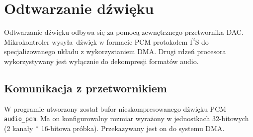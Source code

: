 \documentclass[12pt]{report}
\newcommand{\imgint}[4]{
	\begin{figure}[{#4}]
		\centering
		\texttt{[image: \#1]}
		\caption{#2}
		\label{#1}
	\end{figure}
}
\newcommand{\imgcs}[3]{\imgint{#1}{#2}{#3}{}}
\newcommand{\isqs}{$\text{I}^{2}\text{S}$}
\begin{document}
	\section{Odtwarzanie dźwięku}
%		
%		
%		
		
		
			
		Odtwarzanie dźwięku odbywa się za pomocą zewnętrznego przetwornika DAC. Mikrokontroler wysyła dźwięk w formacie PCM protokołem \isqs{} do specjalizowanego układu z wykorzystaniem DMA. Drugi rdzeń procesora wykorzystywany jest wyłącznie do dekompresji formatów audio.
		
		
		\subsection{Komunikacja z przetwornikiem}
			W programie utworzony został bufor nieskompresowanego dźwięku PCM \lstinline|audio_pcm|. Ma on konfigurowalny rozmiar wyrażony w jednostkach 32-bitowych (2 kanały * 16-bitowa próbka). Przekazywany jest on do systemu DMA.
		
\end{document}
